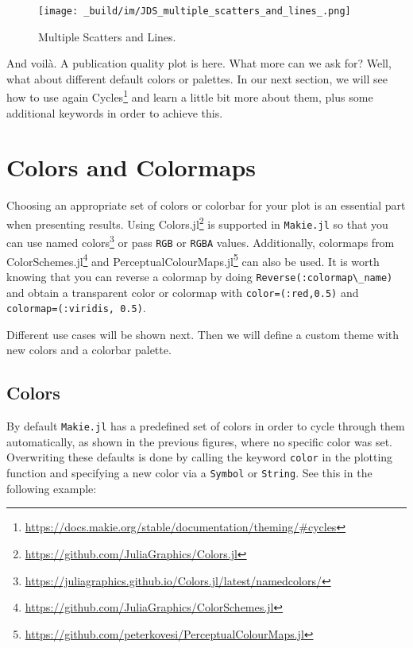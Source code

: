 \documentclass[
  notoc %
]{tufte-book}
\DeclareRobustCommand{\href}[2]{#2\footnote{\url{#1}}}
\newcommand{\passthrough}[1]{#1}
\begin{document}
\begin{figure}
\hypertarget{fig:multiple_scatters_and_lines}{%
\centering
\texttt{[image: \_build/im/JDS\_multiple\_scatters\_and\_lines\_.png]}
\caption{Multiple Scatters and
Lines.}\label{fig:multiple_scatters_and_lines}
}
\end{figure}

And voilà. A publication quality plot is here. What more can we ask for?
Well, what about different default colors or palettes. In our next
section, we will see how to use again
\href{https://docs.makie.org/stable/documentation/theming/\#cycles}{Cycles}
and learn a little bit more about them, plus some additional keywords in
order to achieve this.

\hypertarget{sec:makie_colors}{%
\section{Colors and Colormaps}\label{sec:makie_colors}}

Choosing an appropriate set of colors or colorbar for your plot is an
essential part when presenting results. Using
\href{https://github.com/JuliaGraphics/Colors.jl}{Colors.jl} is
supported in \passthrough{\lstinline!Makie.jl!} so that you can use
\href{https://juliagraphics.github.io/Colors.jl/latest/namedcolors/}{named
colors} or pass \passthrough{\lstinline!RGB!} or
\passthrough{\lstinline!RGBA!} values. Additionally, colormaps from
\href{https://github.com/JuliaGraphics/ColorSchemes.jl}{ColorSchemes.jl}
and
\href{https://github.com/peterkovesi/PerceptualColourMaps.jl}{PerceptualColourMaps.jl}
can also be used. It is worth knowing that you can reverse a colormap by
doing \passthrough{\lstinline!Reverse(:colormap\_name)!} and obtain a
transparent color or colormap with
\passthrough{\lstinline!color=(:red,0.5)!} and
\passthrough{\lstinline!colormap=(:viridis, 0.5)!}.

Different use cases will be shown next. Then we will define a custom
theme with new colors and a colorbar palette.

\hypertarget{colors}{%
\subsection{Colors}\label{colors}}

By default \passthrough{\lstinline!Makie.jl!} has a predefined set of
colors in order to cycle through them automatically, as shown in the
previous figures, where no specific color was set. Overwriting these
defaults is done by calling the keyword \passthrough{\lstinline!color!}
in the plotting function and specifying a new color via a
\passthrough{\lstinline!Symbol!} or \passthrough{\lstinline!String!}.
See this in the following example:
\end{document}
